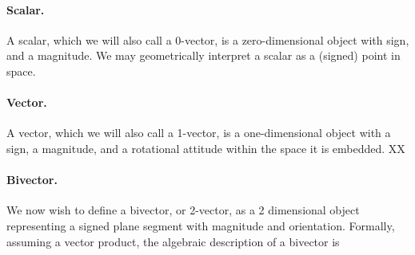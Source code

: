 \paragraph{Scalar.}
A scalar, which we will also call a 0-vector, is a zero-dimensional object with sign, and a magnitude.
We may geometrically interpret a scalar as a (signed) point in space.

\paragraph{Vector.}
A vector, which we will also call a 1-vector, is a one-dimensional object with a sign, a magnitude, and a rotational attitude within the space it is embedded.
XX
\paragraph{Bivector.}

We now wish to define a bivector, or 2-vector, as a 2 dimensional object representing a signed plane segment with magnitude and orientation.  Formally,
assuming a vector product, the algebraic description of a bivector is



